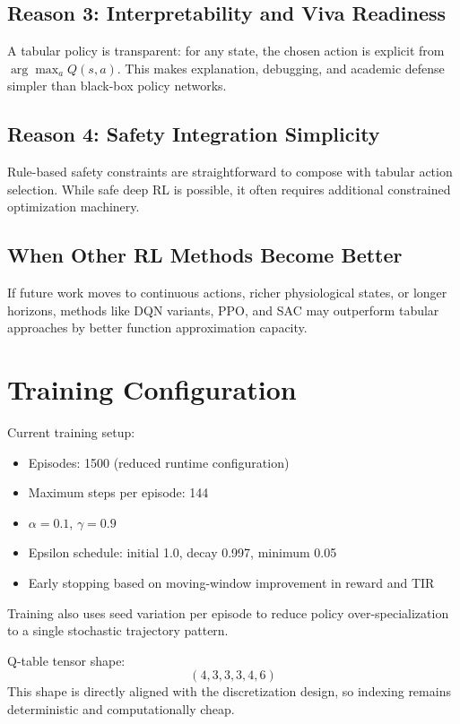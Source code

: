 \documentclass[conference]{IEEEtran}
\begin{document}
\subsection{Reason 3: Interpretability and Viva Readiness}
A tabular policy is transparent: for any state, the chosen action is explicit from \(\arg\max_a Q(s,a)\). This makes explanation, debugging, and academic defense simpler than black-box policy networks.

\subsection{Reason 4: Safety Integration Simplicity}
Rule-based safety constraints are straightforward to compose with tabular action selection. While safe deep RL is possible, it often requires additional constrained optimization machinery.

\subsection{When Other RL Methods Become Better}
If future work moves to continuous actions, richer physiological states, or longer horizons, methods like DQN variants, PPO, and SAC may outperform tabular approaches by better function approximation capacity.

\section{Training Configuration}
Current training setup:
\begin{itemize}
    \item Episodes: 1500 (reduced runtime configuration)
    \item Maximum steps per episode: 144
    \item \(\alpha = 0.1\), \(\gamma = 0.9\)
    \item Epsilon schedule: initial 1.0, decay 0.997, minimum 0.05
    \item Early stopping based on moving-window improvement in reward and TIR
\end{itemize}
Training also uses seed variation per episode to reduce policy over-specialization to a single stochastic trajectory pattern.

Q-table tensor shape:
\begin{equation}
(4,3,3,3,4,6)
\end{equation}
This shape is directly aligned with the discretization design, so indexing remains deterministic and computationally cheap.
\end{document}
